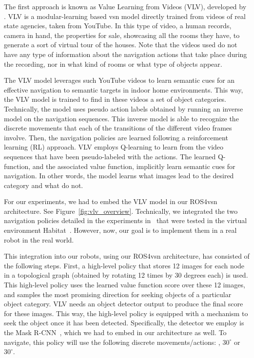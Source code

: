 The first approach is known as Value Learning from Videos (\textsc{VLV}), developed by \cite{chang2020}.
VLV is a modular-learning based \acrshort{vsn} model directly trained from videos of real state agencies, taken from YouTube.
In this type of video, a human records, camera in hand, the properties for sale, showcasing all the rooms they have, to generate a sort of virtual tour of the houses.
Note that the videos used do not have any type of information about the navigation actions that take place during the recording, nor in what kind of rooms or what type of objects appear.

The VLV model leverages such YouTube videos to learn semantic cues for an effective navigation to semantic targets in indoor home environments.
This way, the VLV model is trained to find in these videos a set of object categories.
Technically, the model uses pseudo action labels obtained by running an inverse model on the navigation sequences.
This inverse model is able to recognize the discrete movements that each of the transitions of the different video frames involve.
Then, the navigation policies are learned following a reinforcement learning (RL) approach.
VLV employs Q-learning to learn from the video sequences that have been pseudo-labeled with the actions.
The learned Q-function, and the associated value function, implicitly learn semantic cues for navigation.
In other words, the model learns what images lead to the desired category and what do not.

For our experiments, we had to embed the VLV model in our ROS4\acrshort{vsn} architecture.
See Figure~\ref{fig:vlv_overview}.
Technically, we integrated the two navigation policies detailed in the experiments in~\cite{chang2020} that were tested in the virtual environment Habitat~\cite{NEURIPS2021_021bbc7e}.
However, now, our goal is to implement them in a real robot in the real world.

This integration into our robots, using our ROS4\acrshort{vsn} architecture, has consisted of the following steps.
First, a high-level policy that stores 12 images for each node in a topological graph (obtained by rotating 12 times by 30 degrees each) is used.
This high-level policy uses the learned value function score over these 12 images, and samples the most promising direction for seeking objects of a particular object category.
VLV needs an object detector output to produce the final score for these images.
This way, the high-level policy is equipped with a mechanism to seek the object once it has been detected.
Specifically, the detector we employ is the Mask R-CNN~\cite{mask-rcnn}, which we had to embed in our architecture as well.
To navigate, this policy will use the following discrete movements/actions: \moveforward 25cm, \turnright $30^\circ$ or \turnleft $30^\circ$.

